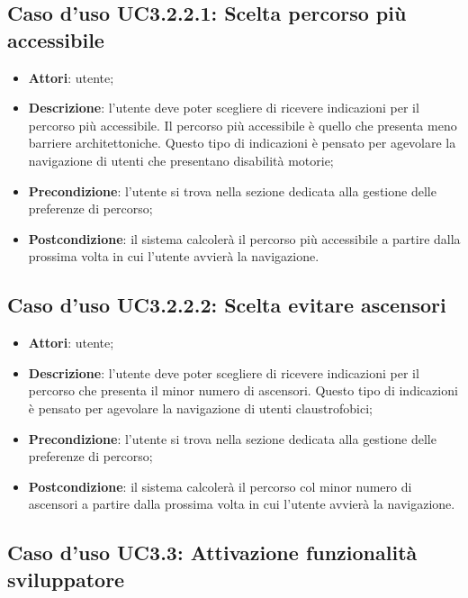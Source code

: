 \documentclass[../AnalisiDeiRequisiti.tex]{subfiles}
\begin{document}
\subsection{Caso d'uso UC3.2.2.1: Scelta percorso più accessibile}
\begin{itemize}
\item \textbf{Attori}: utente;
\item \textbf{Descrizione}: l'utente deve poter scegliere di ricevere indicazioni per il percorso più accessibile. Il percorso più accessibile è quello che presenta meno barriere architettoniche. Questo tipo di indicazioni è pensato per agevolare la navigazione di utenti che presentano disabilità motorie; 
      \item \textbf{Precondizione}: l'utente si trova nella sezione dedicata alla gestione delle preferenze di percorso;
    \item \textbf{Postcondizione}: il sistema calcolerà il percorso più accessibile a partire dalla prossima volta in cui l'utente avvierà la navigazione.
  \end{itemize}
\hypertarget{UC3.2.2.2}{}
\subsection{Caso d'uso UC3.2.2.2: Scelta evitare ascensori}
\begin{itemize}
\item \textbf{Attori}: utente;
\item \textbf{Descrizione}: l'utente deve poter scegliere di ricevere indicazioni per il percorso che presenta il minor numero di ascensori. Questo tipo di indicazioni è pensato per agevolare la navigazione di utenti claustrofobici; 
      \item \textbf{Precondizione}: l'utente si trova nella sezione dedicata alla gestione delle preferenze di percorso;
    \item \textbf{Postcondizione}: il sistema calcolerà il percorso col minor numero di ascensori a partire dalla prossima volta in cui l'utente avvierà la navigazione.
  \end{itemize}
\hypertarget{UC3.3}{}
\subsection{Caso d'uso UC3.3: Attivazione funzionalità sviluppatore}
\end{document}
